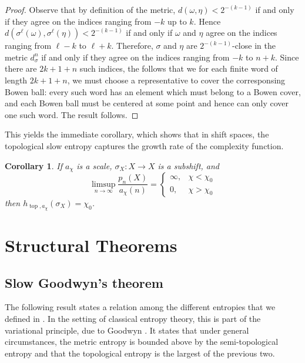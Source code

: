 \documentclass[oneside]{amsart}
\theoremstyle{plain}
\newtheorem{COR}[THM]{Corollary}
\theoremstyle{definition}
\newcommand{\<}{\langle}
\renewcommand{\>}{\rangle}
\newcommand{\topo}{\operatorname{top}}
\renewcommand{\|}{|\!|} %
\begin{document}
\begin{proof}
    Observe that by definition of the metric, $d(\omega,\eta) < 2^{-(k-1)}$ if and only if they agree on the indices ranging from $-k$ up to $k$. Hence $d(\sigma^\ell(\omega),\sigma^\ell(\eta)) < 2^{-(k-1)}$ if and only if $\omega$ and $\eta$ agree on the indices ranging from $\ell - k$ to $\ell + k$. Therefore, $\sigma$ and $\eta$ are $2^{-(k-1)}$-close in the metric $d^n_\sigma$ if and only if they agree on the indices ranging from $-k$ to $n+k$. Since there are $2k+1+n$ such indices, the follows that we for each finite word of length $2k+1+n$, we must choose a representative to cover the corresponsing Bowen ball: every such word has an element which must belong to a Bowen cover, and each Bowen ball must be centered at some point and hence can only cover one such word. The result follows.
\end{proof}

This yields the immediate corollary, which shows that in shift spaces, the topological slow entropy captures the growth rate of the complexity function.

\begin{COR}
\label{cor:TopEntropy&Compl}
    If $a_\chi$ is a scale, $\sigma_X : X \to X$ is a subshift, and
    \begin{equation*}
        \limsup_{n \to \infty}\dfrac{p_n(X)}{a_\chi(n)} = \left\lbrace\begin{array}{ll}\infty, & \chi < \chi_0 \\ 0, & \chi > \chi_0\end{array}\right.
    \end{equation*}
    then $h_{\topo,a_\chi}(\sigma_X) = \chi_0$.
\end{COR}

\section{Structural Theorems}
\label{sec:structuralthms}


\subsection{Slow Goodwyn's theorem}
The following result states a relation among the different entropies that we defined in .  In the setting of classical entropy theory, this is part of the variational principle, due to Goodwyn \cite{goodwyn}. It states that under general circumstances, the metric entropy is bounded above by the semi-topological entropy and that the topological entropy is the largest of the previous two. 
\end{document}
